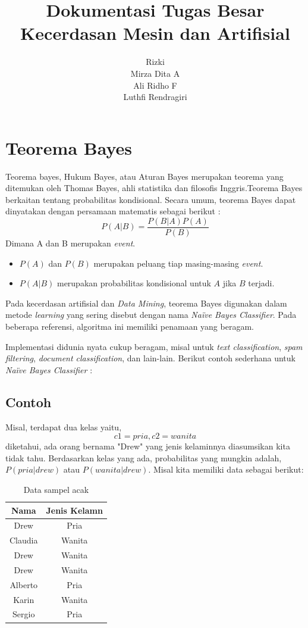 \documentclass[11pt,a4paper]{report}
\author{
	Rizki\\
	Mirza Dita A\\
	Ali Ridho F\\
	Luthfi Rendragiri
}
\title{
	\textbf{Dokumentasi Tugas Besar}\\
	\textbf{Kecerdasan Mesin dan Artifisial}
}
\begin{document}
	\maketitle
	\section*{Teorema Bayes}
	Teorema bayes, Hukum Bayes, atau Aturan Bayes merupakan teorema yang ditemukan oleh Thomas Bayes, ahli statistika dan filosofis Inggris.Teorema Bayes berkaitan tentang probabilitas kondisional. Secara umum, teorema Bayes dapat dinyatakan dengan persamaan matematis sebagai berikut :
	\[ P(A|B)=\frac{P(B|A)P(A)}{P(B)} \]
	Dimana A dan B merupakan \emph{event}.
	\begin{itemize}
		\item $P(A)$ dan $P(B)$ merupakan peluang tiap masing-masing \emph{event}.
		\item $P(A|B)$ merupakan probabilitas kondisional untuk $A$ jika $B$ terjadi.
	\end{itemize} 
	
	Pada kecerdasan artifisial dan \emph{Data Mining}, teorema Bayes digunakan dalam metode \emph{learning} yang sering disebut dengan nama \emph{Na\"{i}ve Bayes Classifier}. Pada beberapa referensi, algoritma ini memiliki penamaan yang beragam.
	
	Implementasi didunia nyata cukup beragam, misal untuk \emph{text classification}, \emph{spam filtering}, \emph{document classification}, dan lain-lain. Berikut contoh sederhana untuk \emph{Na\"{i}ve Bayes Classifier} : 
	\subsection*{Contoh}
	Misal, terdapat dua kelas yaitu,
	\[ c1=pria, c2=wanita \]
	diketahui, ada orang bernama "Drew" yang jenis kelaminnya diasumsikan kita tidak tahu. Berdasarkan kelas yang ada, probabilitas yang mungkin adalah, $P(pria|drew)$ atau $P(wanita|drew)$.
	Misal kita memiliki data sebagai berikut:
	
	\begin{table}[h]
		\centering
		\begin{tabular}{|c|c|}
			\hline Nama & Jenis Kelamn \\ 
			\hline Drew & Pria \\ 
			\hline Claudia & Wanita \\ 
			\hline Drew & Wanita \\ 
			\hline Drew & Wanita \\ 
			\hline Alberto & Pria \\ 
			\hline Karin & Wanita \\ 
			\hline Sergio & Pria \\ 
			\hline 
		\end{tabular}
		\caption{Data sampel acak}
	\end{table} 
	
\end{document}
